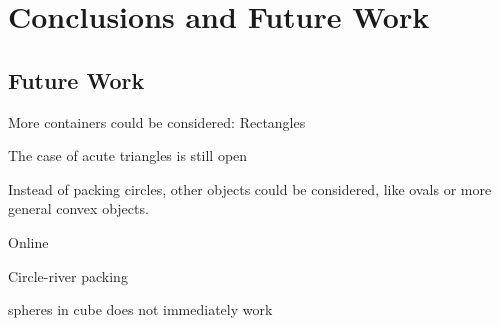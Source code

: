 \chapter{Conclusions and Future Work}

\section{Future Work}

More containers could be considered: Rectangles

The case of acute triangles is still open

Instead of packing circles, other objects could be considered, like ovals or more general convex objects.

Online

Circle-river packing

spheres in cube does not immediately work
